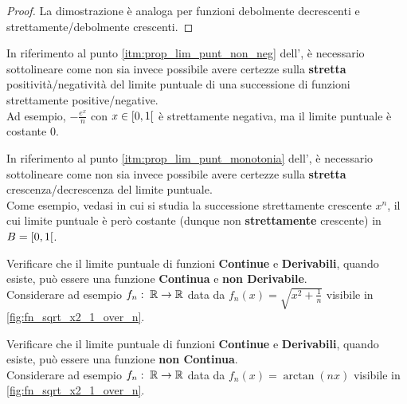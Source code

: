 \begin{exercise}
\begin{solution}
\begin{enumerate}
\begin{proof}
					La dimostrazione è analoga per funzioni debolmente decrescenti e strettamente/debolmente crescenti.
					\let\qed\relax %
				\end{proof}
			\vspace*{-2\baselineskip} %
		\end{enumerate}
	\end{solution}
\end{exercise}
\begin{observation}
	In riferimento al punto \ref{itm:prop_lim_punt_non_neg} dell', è necessario sottolineare come non sia invece possibile avere certezze sulla \textbf{stretta} positività/negatività del limite puntuale di una successione di funzioni strettamente positive/negative.\\
	Ad esempio, $-\frac{e^x}{n}$ con $x \in \left[0,1\right[$ è strettamente negativa, ma il limite puntuale è costante $0$.
\end{observation}
\begin{observation}
	In riferimento al punto \ref{itm:prop_lim_punt_monotonia} dell', è necessario sottolineare come non sia invece possibile avere certezze sulla \textbf{stretta} crescenza/decrescenza del limite puntuale.\\
	Come esempio, vedasi  in cui si studia la successione strettamente crescente $x^n$, il cui limite puntuale è però costante (dunque non \textbf{strettamente} crescente) in $B = \left[0,1\right[$.
\end{observation}
\begin{exercise}
	Verificare che il limite puntuale di funzioni \textbf{Continue} e \textbf{Derivabili}, quando esiste, può essere una funzione \textbf{Continua} e \textbf{non Derivabile}.\\
	Considerare ad esempio $f_n:\; \mathbb{R} \to \mathbb{R}$ data da $f_n(x) = \sqrt{x^2 + \frac{1}{n}}$ visibile in \cref{fig:fn_sqrt_x2_1_over_n}.
\end{exercise}
\begin{exercise}
	Verificare che il limite puntuale di funzioni \textbf{Continue} e \textbf{Derivabili}, quando esiste, può essere una funzione \textbf{non Continua}.\\
	Considerare ad esempio $f_n:\; \mathbb{R} \to \mathbb{R}$ data da $f_n(x) = \arctan(nx)$ visibile in \cref{fig:fn_sqrt_x2_1_over_n}.
\end{exercise}
